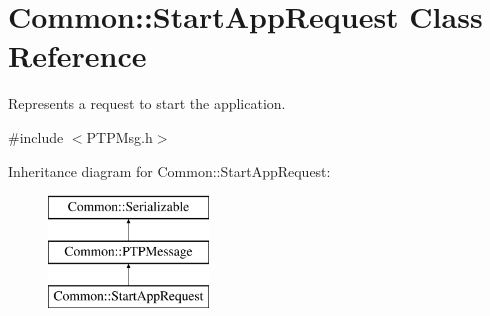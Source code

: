 \hypertarget{class_common_1_1_start_app_request}{\section{Common\-:\-:Start\-App\-Request Class Reference}
\label{class_common_1_1_start_app_request}
}


Represents a request to start the application.  




{\ttfamily \#include $<$P\-T\-P\-Msg.\-h$>$}

Inheritance diagram for Common\-:\-:Start\-App\-Request\-:\begin{figure}[H]
\begin{center}
\leavevmode
\includegraphics[height=3.000000cm]{class_common_1_1_start_app_request}
\end{center}
\end{figure}
